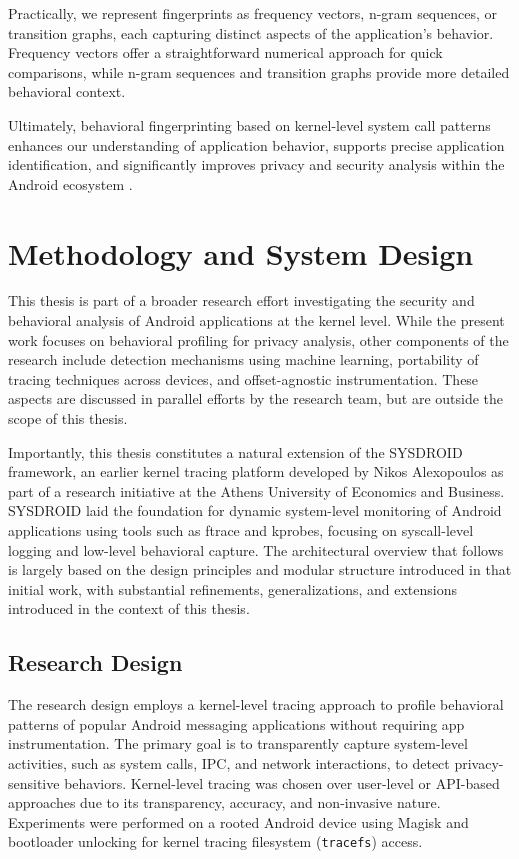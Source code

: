\documentclass[a4paper,12pt]{report}
\begin{document}
Practically, we represent fingerprints as frequency vectors, n-gram sequences, or transition graphs, each capturing distinct aspects of the application's behavior. Frequency vectors offer a straightforward numerical approach for quick comparisons, while n-gram sequences and transition graphs provide more detailed behavioral context.

Ultimately, behavioral fingerprinting based on kernel-level system call patterns enhances our understanding of application behavior, supports precise application identification, and significantly improves privacy and security analysis within the Android ecosystem \cite{felt2011androidprivacy}.


\chapter{Methodology and System Design}

This thesis is part of a broader research effort investigating the security and behavioral analysis of Android applications at the kernel level. While the present work focuses on behavioral profiling for privacy analysis, other components of the research include detection mechanisms using machine learning, portability of tracing techniques across devices, and offset-agnostic instrumentation. These aspects are discussed in parallel efforts by the research team, but are outside the scope of this thesis.

Importantly, this thesis constitutes a natural extension of the SYSDROID framework, an earlier kernel tracing platform developed by Nikos Alexopoulos as part of a research initiative at the Athens University of Economics and Business. SYSDROID laid the foundation for dynamic system-level monitoring of Android applications using tools such as ftrace and kprobes, focusing on syscall-level logging and low-level behavioral capture. The architectural overview that follows is largely based on the design principles and modular structure introduced in that initial work, with substantial refinements, generalizations, and extensions introduced in the context of this thesis.

\section{Research Design}

The research design employs a kernel-level tracing approach to profile behavioral patterns of popular Android messaging applications without requiring app instrumentation. The primary goal is to transparently capture system-level activities, such as system calls, IPC, and network interactions, to detect privacy-sensitive behaviors. Kernel-level tracing was chosen over user-level or API-based approaches due to its transparency, accuracy, and non-invasive nature. Experiments were performed on a rooted Android device using Magisk and bootloader unlocking for kernel tracing filesystem (\texttt{tracefs}) access.
\end{document}
